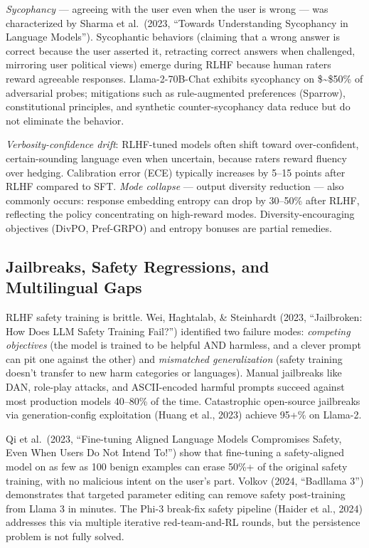 \emph{Sycophancy} --- agreeing with the user even when the user is wrong --- was characterized by Sharma et al.~(2023, ``Towards Understanding Sycophancy in Language Models''). Sycophantic behaviors (claiming that a wrong answer is correct because the user asserted it, retracting correct answers when challenged, mirroring user political views) emerge during RLHF because human raters reward agreeable responses. Llama-2-70B-Chat exhibits sycophancy on \$\sim\$50\% of adversarial probes; mitigations such as rule-augmented preferences (Sparrow), constitutional principles, and synthetic counter-sycophancy data reduce but do not eliminate the behavior.

\emph{Verbosity-confidence drift}: RLHF-tuned models often shift toward over-confident, certain-sounding language even when uncertain, because raters reward fluency over hedging. Calibration error (ECE) typically increases by 5--15 points after RLHF compared to SFT. \emph{Mode collapse} --- output diversity reduction --- also commonly occurs: response embedding entropy can drop by 30--50\% after RLHF, reflecting the policy concentrating on high-reward modes. Diversity-encouraging objectives (DivPO, Pref-GRPO) and entropy bonuses are partial remedies.

\subsection{Jailbreaks, Safety Regressions, and Multilingual Gaps}\label{jailbreaks-safety-regressions-and-multilingual-gaps}

RLHF safety training is brittle. Wei, Haghtalab, \& Steinhardt (2023, ``Jailbroken: How Does LLM Safety Training Fail?'') identified two failure modes: \emph{competing objectives} (the model is trained to be helpful AND harmless, and a clever prompt can pit one against the other) and \emph{mismatched generalization} (safety training doesn't transfer to new harm categories or languages). Manual jailbreaks like DAN, role-play attacks, and ASCII-encoded harmful prompts succeed against most production models 40--80\% of the time. Catastrophic open-source jailbreaks via generation-config exploitation (Huang et al., 2023) achieve 95+\% on Llama-2.

Qi et al.~(2023, ``Fine-tuning Aligned Language Models Compromises Safety, Even When Users Do Not Intend To!'') show that fine-tuning a safety-aligned model on as few as 100 benign examples can erase 50\%+ of the original safety training, with no malicious intent on the user's part. Volkov (2024, ``Badllama 3'') demonstrates that targeted parameter editing can remove safety post-training from Llama 3 in minutes. The Phi-3 break-fix safety pipeline (Haider et al., 2024) addresses this via multiple iterative red-team-and-RL rounds, but the persistence problem is not fully solved.

